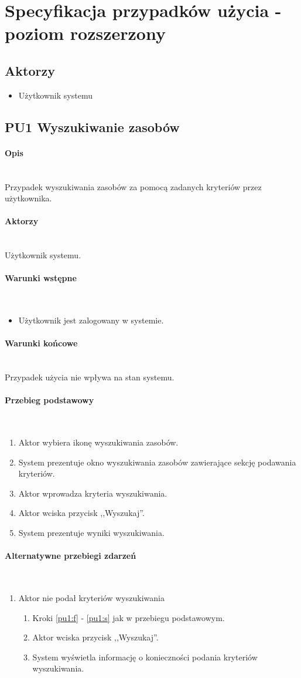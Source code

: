 \section{Specyfikacja przypadków użycia - poziom rozszerzony}
\newcommand{\myparagraph}[1]{\paragraph{#1}\mbox{}\\}

\subsection{Aktorzy}
\begin{itemize}
\item Użytkownik systemu
\end{itemize}


\subsection{PU1 Wyszukiwanie zasobów} \label{pu1}
\myparagraph{Opis}
Przypadek wyszukiwania zasobów za pomocą zadanych kryteriów przez użytkownika.

\myparagraph{Aktorzy}
Użytkownik systemu.

\myparagraph{Warunki wstępne}
\begin{itemize}
\item Użytkownik jest zalogowany w systemie.
\end{itemize}

\myparagraph{Warunki końcowe}
Przypadek użycia nie wpływa na stan systemu.

\myparagraph{Przebieg podstawowy}
\begin{enumerate}
\item \label{pu1:f} Aktor wybiera ikonę wyszukiwania zasobów.
\item \label{pu1:s}System prezentuje okno wyszukiwania zasobów zawierające sekcję podawania kryteriów.
\item Aktor wprowadza kryteria wyszukiwania.
\item Aktor wciska przycisk ,,Wyszukaj''.
\item System prezentuje wyniki wyszukiwania.
\end{enumerate}

\myparagraph{Alternatywne przebiegi zdarzeń}
\begin{enumerate}
\item Aktor nie podał kryteriów wyszukiwania
	\begin{enumerate}[label*=\arabic*.]
	\item Kroki \ref{pu1:f} - \ref{pu1:s} jak w przebiegu podstawowym.
	\item Aktor wciska przycisk ,,Wyszukaj''.
	\item System wyświetla informację o konieczności podania kryteriów wyszukiwania.
	\end{enumerate}
\end{enumerate}

